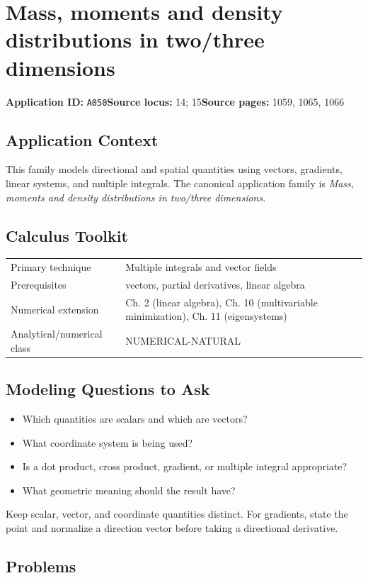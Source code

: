 \documentclass[11pt]{book}
\newcommand{\pid}[1]{\texttt{#1}}
\begin{document}
\chapter{Mass, moments and density distributions in two/three dimensions}\label{app:A050}
\textbf{Application ID:} \pid{A050}\quad \textbf{Source locus:} 14; 15\quad \textbf{Source pages:} 1059, 1065, 1066
\section*{Application Context}
This family models directional and spatial quantities using vectors, gradients, linear systems, and multiple integrals. The canonical application family is \emph{Mass, moments and density distributions in two/three dimensions}.
\section*{Calculus Toolkit}
\begin{tabularx}{\textwidth}{@{}lX@{}}\toprule
Primary technique & Multiple integrals and vector fields \\
Prerequisites & vectors, partial derivatives, linear algebra \\
Numerical extension & Ch. 2 (linear algebra), Ch. 10 (multivariable minimization), Ch. 11 (eigensystems) \\
Analytical/numerical class & NUMERICAL-NATURAL \\
\bottomrule\end{tabularx}
\section*{Modeling Questions to Ask}\begin{itemize}
\item Which quantities are scalars and which are vectors?
\item What coordinate system is being used?
\item Is a dot product, cross product, gradient, or multiple integral appropriate?
\item What geometric meaning should the result have?
\end{itemize}
\begin{errorbox}Keep scalar, vector, and coordinate quantities distinct. For gradients, state the point and normalize a direction vector before taking a directional derivative.\end{errorbox}
\section*{Problems}
\end{document}
